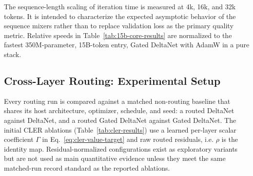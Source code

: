 \documentclass{article}
\begin{document}
The sequence-length scaling of iteration time is measured at 4k, 16k, and 32k tokens. It is intended to characterize the expected asymptotic behavior of the sequence mixers rather than to replace validation loss as the primary quality metric. Relative speeds in Table~\ref{tab:15b-core-results} are normalized to the fastest 350M-parameter, 15B-token entry, Gated DeltaNet with AdamW in a pure stack.

\subsection{Cross-Layer Routing: Experimental Setup}

Every routing run is compared against a matched non-routing baseline that shares its host architecture, optimizer, schedule, and seed: a routed DeltaNet against DeltaNet, and a routed Gated DeltaNet against Gated DeltaNet. The initial CLER ablations (Table~\ref{tab:cler-results}) use a learned per-layer scalar coefficient $\Gamma$ in Eq.~\eqref{eq:cler-value-target} and raw routed residuals, i.e. $\rho$ is the identity map. Residual-normalized configurations exist as exploratory variants but are not used as main quantitative evidence unless they meet the same matched-run record standard as the reported ablations.

\end{document}
